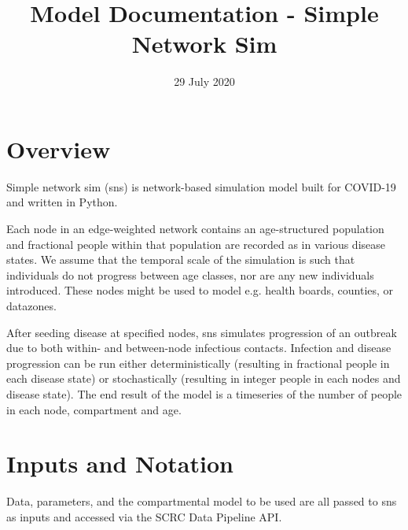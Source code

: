 \documentclass[11pt]{article}
\title{Model Documentation - Simple Network Sim}
\date{29 July 2020}                                           %
\begin{document}
\maketitle
\section{Overview}

Simple network sim (sns) is network-based simulation model built for COVID-19 and written in Python.

Each node in an edge-weighted network contains an age-structured population and fractional people within that population are recorded as in various disease states. We assume that the temporal scale of the simulation is such that individuals do not progress between age classes, nor are any new individuals introduced. These nodes might be used to model e.g. health boards, counties, or datazones.  

After seeding disease at specified nodes, sns simulates progression of an outbreak due to both within- and between-node infectious contacts.  Infection and disease progression can be run either deterministically (resulting in fractional people in each disease state) or stochastically (resulting in integer people in each nodes and disease state).  The end result of the model is a timeseries of the number of people in each node, compartment and age.

\section{Inputs and Notation}

Data, parameters, and the compartmental model to be used are all passed to sns as inputs and accessed via the SCRC Data Pipeline API.  
\end{document}
